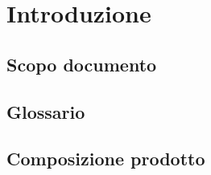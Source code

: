 \section{Introduzione}
\subsection{Scopo documento}


\subsection{Glossario}
 
\subsection{Composizione prodotto}
